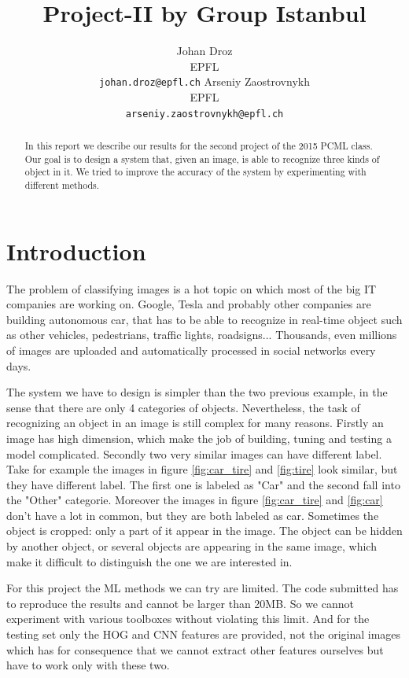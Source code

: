 \documentclass{article} %
\title{Project-II by Group Istanbul}
\author{
Johan Droz\\
EPFL \\
\texttt{johan.droz@epfl.ch} \And
Arseniy Zaostrovnykh\\
EPFL \\
\texttt{arseniy.zaostrovnykh@epfl.ch}
}
\begin{document}
\maketitle

\begin{abstract}
In this report we describe our results for the second project of the 2015 PCML class.
Our goal is to design a system that, given an image, is able to recognize three kinds of object in it.
We tried to improve the accuracy of the system by experimenting with different methods.

\end{abstract}

\section{Introduction}

The problem of classifying images is a hot topic on which most of the big IT companies are working on.
Google, Tesla and probably other companies are building autonomous car, that has to be able to recognize in real-time object such as other vehicles, pedestrians, traffic lights, roadsigns...
Thousands, even millions of images are uploaded and automatically processed in social networks every days.

The system we have to design is simpler than the two previous example, in the sense that there are only 4 categories of objects. Nevertheless, the task of recognizing an object in an image is still complex for many reasons.
Firstly an image has high dimension, which make the job of building, tuning and testing a model complicated.
Secondly two very similar images can have different label.
Take for example the images in figure \ref{fig:car_tire} and \ref{fig:tire} look similar, but they have different label. The first one is labeled as "Car" and the second fall into the "Other" categorie. Moreover the images in figure \ref{fig:car_tire} and \ref{fig:car} don't have a lot in common, but they are both labeled as car.
Sometimes the object is cropped: only a part of it appear in the image. The object can be hidden by another object, or several objects are appearing in the same image, which make it difficult to distinguish the one we are interested in.

For this project the ML methods we can try are limited. The code submitted has to reproduce the results and cannot be larger than 20MB. So we cannot experiment with various toolboxes without violating this limit.
And for the testing set only the HOG and CNN features are provided, not the original images which has for consequence that we cannot extract other features ourselves but have to work only with these two.
\end{document}
